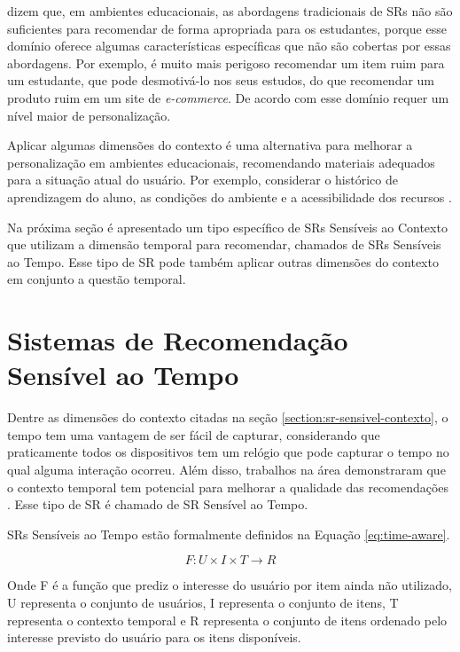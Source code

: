  dizem que, em ambientes educacionais, as abordagens tradicionais de SRs não são
suficientes para recomendar de forma apropriada para os estudantes, porque esse domínio oferece algumas características
específicas que não são cobertas por essas abordagens. Por exemplo, é muito mais perigoso recomendar um item ruim para
um estudante, que pode desmotivá-lo nos seus estudos, do que recomendar um produto ruim em um site de \textit{e-commerce}.
De acordo com  esse domínio requer um nível maior de personalização.

Aplicar algumas dimensões do contexto é uma alternativa para melhorar a personalização em ambientes educacionais,
recomendando materiais adequados para a situação atual do usuário. Por exemplo, considerar o histórico de aprendizagem
do aluno, as condições do ambiente e a acessibilidade dos recursos \cite{verbert2012context}.

Na próxima seção é apresentado um tipo específico de SRs Sensíveis ao Contexto que utilizam a dimensão temporal para
recomendar, chamados de SRs Sensíveis ao Tempo. Esse tipo de SR pode também aplicar outras dimensões do contexto em
conjunto a questão temporal.

\section{Sistemas de Recomendação Sensível ao Tempo}\label{section:sr-sensivel-tempo}

Dentre as dimensões do contexto citadas na seção \ref{section:sr-sensivel-contexto}, o tempo tem uma vantagem de ser
fácil de capturar, considerando que praticamente todos os dispositivos tem um relógio que pode capturar o tempo no qual
alguma interação ocorreu. Além disso, trabalhos na área demonstraram que o contexto temporal tem potencial para melhorar
a qualidade das recomendações \cite{campos2014time}. Esse tipo de SR é chamado de SR Sensível ao Tempo.

SRs Sensíveis ao Tempo estão formalmente definidos na Equação \ref{eq:time-aware}.

\begin{equation}
  F: U \times I \times T \rightarrow R
  \label{eq:time-aware}
\end{equation}

Onde F é a função que prediz o interesse do usuário por item ainda não utilizado, U representa o conjunto de usuários,
I representa o conjunto de itens, T representa o contexto temporal e R representa o conjunto de itens ordenado pelo interesse previsto do usuário para os itens disponíveis.

